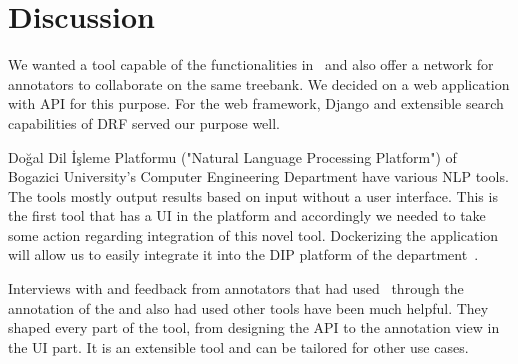 \section{Discussion}
\label{sec:discussion}

We wanted a tool capable of the functionalities in \boatvone\ and also offer a network for annotators to collaborate on the same treebank.
We decided on a web application with API for this purpose.
For the web framework, Django and extensible search capabilities of DRF served our purpose well.

Doğal Dil İşleme Platformu ("Natural Language Processing Platform") of Bogazici University's Computer Engineering Department have various NLP tools.
The tools mostly output results based on input without a user interface.
This is the first tool that has a UI in the platform and accordingly we needed to take some action regarding integration of this novel tool.
Dockerizing the application will allow us to easily integrate it into the DIP platform of the department~\cite{DIP}.

Interviews with and feedback from annotators that had used \boatvone\ through the annotation of the \bountreebank{} and also had used other tools have been much helpful.
They shaped every part of the tool, from designing the API to the annotation view in the UI part.
It is an extensible tool and can be tailored for other use cases.

